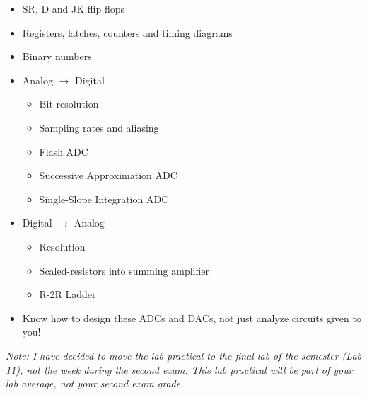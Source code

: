 \documentclass[10pt]{report}
\begin{document}
\begin{itemize}
\begin{itemize}
    \item SR, D and JK flip flops
    \item Registers, latches, counters and timing diagrams
    \item Binary numbers
    \item Analog $\rightarrow$ Digital
    \begin{itemize}
        \item Bit resolution
        \item Sampling rates and aliasing
        \item Flash ADC
        \item Successive Approximation ADC
        \item Single-Slope Integration ADC 
    \end{itemize}
    \item Digital $\rightarrow$ Analog
    \begin{itemize}
        \item Resolution
        \item Scaled-resistors into summing amplifier
        \item R-2R Ladder
    \end{itemize}
    \item Know how to design these ADCs and DACs, not just analyze circuits given to you!
\end{itemize}
\end{itemize}

\emph{Note: I have decided to move the lab practical to the final lab of the
semester (Lab 11), not the week during the second exam.  This lab practical
will be part of your lab average, not your second exam grade.}
\end{document}
